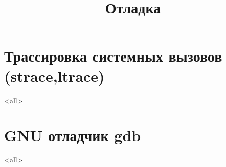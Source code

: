 

\title[Отладка]{Отладка}





\begin{frame}
	\frametitle{}
	\titlepage
	\vspace{-0.5cm}
	\begin{center}
	\end{center}
\end{frame}

\begin{frame}
	\tableofcontents
\end{frame}




\section[strace]{Трассировка системных вызовов (strace,ltrace)}
\mode<all>{}
\section[gdb]{GNU отладчик gdb}
\mode<all>{}


